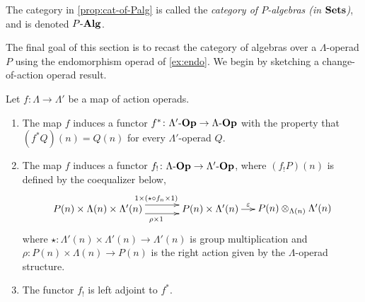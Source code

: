 \begin{nota}\label{nota:cat-of-palg}
The category in \cref{prop:cat-of-Palg} is called the \emph{category of $P$-algebras (in $\mathbf{Sets}$)}, and is denoted $P\mbox{-}\mathbf{Alg}$.
\end{nota}

The final goal of this section is to recast the category of algebras over a $\Lambda$-operad $P$ using the endomorphism operad of \cref{ex:endo}.
We begin by sketching a change-of-action operad result.

\begin{thm}\label{thm:pbaop}
Let $f \colon \Lambda \rightarrow \Lambda'$ be a map of action operads. 
\begin{enumerate}
\item The map $f$ induces a functor $f^{*} \colon \Lambda'\mbox{-}\mathbf{Op} \rightarrow \Lambda\mbox{-}\mathbf{Op}$ with the property that $(f^{*}Q)(n) = Q(n)$ for every $\Lambda'$-operad $Q$.
\item The map $f$ induces a functor $f_{!} \colon \Lambda\mbox{-}\mathbf{Op} \rightarrow \Lambda'\mbox{-}\mathbf{Op}$, where $(f_{!}P)(n)$ is defined by the coequalizer below,
    \[
        \xy
            (-10,0)*+{P(n) \times \Lambda(n) \times \Lambda'(n)}="00";
            (30,0)*+{P(n) \times \Lambda'(n)}="10";
            (60,0)*+{\coeqb{P(n)}{\Lambda'(n)}{\Lambda(n)}}="20";
            {\ar@<1ex>^(.52){1 \times (\star \circ f_n \times 1)} "00" ; "10"};
            {\ar@<-1ex>_(.52){\rho \times 1} "00" ; "10"};
            {\ar^(.45){\varepsilon} "10" ; "20"};
        \endxy
    \]
where $\star \colon \Lambda'(n) \times \Lambda'(n) \to \Lambda'(n)$ is group multiplication and $\rho \colon P(n) \times \Lambda(n) \to P(n)$ is the right action given by the $\Lambda$-operad structure. 
\item The functor $f_{!}$ is left adjoint to $f^*$.
\end{enumerate}
\end{thm}
